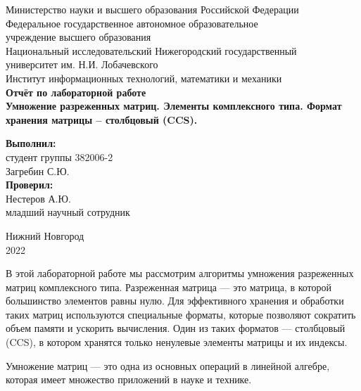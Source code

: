 \documentclass[12pt]{article}
\begin{document}
\begin{center}  %
Министерство науки и высшего образования Российской Федерации\\
\hfill \break
Федеральное государственное автономное образовательное\\
учреждение высшего образования\\
Национальный исследовательский Нижегородский государственный\\
университет им. Н.И. Лобачевского\\
\hfill \break
Институт информационных технологий, математики и механики\\ %
\hfill \break \hfill \break \hfill \break \hfill \break \hfill \break \hfill \break \hfill \break \hfill \break
\large{\textbf{Отчёт по лабораторной работе\\
Умножение разреженных матриц. Элементы комплексного типа. Формат хранения матрицы – столбцовый (CCS).}} \end{center} %
\hfill \break \hfill \break \hfill \break \hfill \break \hfill \break 
\textbf{Выполнил:} \\
студент группы 382006-2\\
Загребин С.Ю.\\
\hfill \break
\textbf{Проверил:} \\
Нестеров А.Ю.\\
младший научный сотрудник\\
\hfill \break \hfill \break \hfill \break \hfill \break \hfill \break \hfill \break 
\begin{center} Нижний Новгород\\ 2022 \end{center}
\thispagestyle{empty} %
\newpage    %

В этой лабораторной работе мы рассмотрим алгоритмы умножения разреженных матриц комплексного типа. Разреженная матрица — это матрица, в которой большинство элементов равны нулю. Для эффективного хранения и обработки таких матриц используются специальные форматы, которые позволяют сократить объем памяти и ускорить вычисления. Один из таких форматов — столбцовый (CCS), в котором хранятся только ненулевые элементы матрицы и их индексы.

Умножение матриц — это одна из основных операций в линейной алгебре, которая имеет множество приложений в науке и технике.
\end{document}
